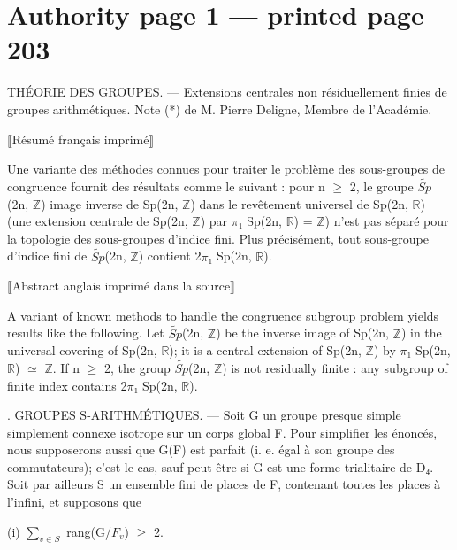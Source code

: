 \documentclass[10pt,a4paper]{article}
\begin{document}
\small
{}\hypertarget{authority-page-0001}{}
\section*{Authority page 1 --- printed page 203}
\noindent THÉORIE DES GROUPES. — Extensions centrales non résiduellement finies de groupes arithmétiques. Note (*) de M. Pierre Deligne, Membre de l'Académie.\par
\smallskip
\noindent ⟦Résumé français imprimé⟧\par
\noindent Une variante des méthodes connues pour traiter le problème des sous-groupes de congruence fournit des résultats comme le suivant : pour n \ensuremath{≥} 2, le groupe \ensuremath{\widetilde{Sp}}(2n, \ensuremath{ℤ}) image inverse de Sp(2n, \ensuremath{ℤ}) dans le revêtement universel de Sp(2n, \ensuremath{ℝ}) (une extension centrale de Sp(2n, \ensuremath{ℤ}) par \ensuremath{π₁} Sp(2n, \ensuremath{ℝ}) = \ensuremath{ℤ}) n'est pas séparé pour la topologie des sous-groupes d'indice fini. Plus précisément, tout sous-groupe d'indice fini de \ensuremath{\widetilde{Sp}}(2n, \ensuremath{ℤ}) contient 2\ensuremath{π₁} Sp(2n, \ensuremath{ℝ}).\par
\smallskip
\noindent ⟦Abstract anglais imprimé dans la source⟧\par
\noindent A variant of known methods to handle the congruence subgroup problem yields results like the following. Let \ensuremath{\widetilde{Sp}}(2n, \ensuremath{ℤ}) be the inverse image of Sp(2n, \ensuremath{ℤ}) in the universal covering of Sp(2n, \ensuremath{ℝ}); it is a central extension of Sp(2n, \ensuremath{ℤ}) by \ensuremath{π₁} Sp(2n, \ensuremath{ℝ}) \ensuremath{≃} \ensuremath{ℤ}. If n \ensuremath{≥} 2, the group \ensuremath{\widetilde{Sp}}(2n, \ensuremath{ℤ}) is not residually finite : any subgroup of finite index contains 2\ensuremath{π₁} Sp(2n, \ensuremath{ℝ}).\par
\smallskip
{}. GROUPES S-ARITHMÉTIQUES. — Soit G un groupe presque simple simplement connexe isotrope sur un corps global F. Pour simplifier les énoncés, nous supposerons aussi que G(F) est parfait (i. e. égal à son groupe des commutateurs); c'est le cas, sauf peut-être si G est une forme trialitaire de D\ensuremath{₄}. Soit par ailleurs S un ensemble fini de places de F, contenant toutes les places à l'infini, et supposons que\par
\smallskip
\noindent (i)    \ensuremath{∑_{v∈S}} rang(G/\ensuremath{F_v}) \ensuremath{≥} 2.\par
\end{document}
